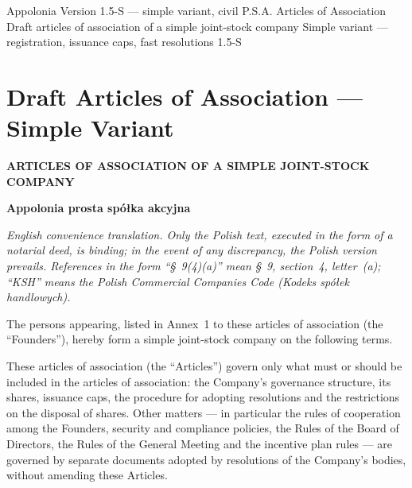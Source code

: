 \documentclass[12pt,a4paper]{report}
\newcommand{\CompanyFull}{Appolonia prosta spółka akcyjna}
\begin{document}
\BusinessPlanTitlePage
  {Appolonia}
  {Version 1.5-S --- simple variant, civil}
  {P.S.A. Articles of Association}
  {Draft articles of association of a simple joint-stock company}
  {Simple variant --- registration, issuance caps, fast resolutions}
  {1.5-S}

\tableofcontents
\newpage

\chapter*{Draft Articles of Association --- Simple Variant}

\begin{center}
{\Large\bfseries ARTICLES OF ASSOCIATION OF A SIMPLE JOINT-STOCK COMPANY}\par
\vspace{0.25cm}
{\LARGE\bfseries \CompanyFull}\par
\vspace{0.6cm}
\end{center}

\begin{center}
\small\itshape English convenience translation. Only the Polish text, executed in the form of a notarial deed, is binding; in the event of any discrepancy, the Polish version prevails. References in the form ``\S~9(4)(a)'' mean \S~9, section~4, letter~(a); ``KSH'' means the Polish Commercial Companies Code (\textit{Kodeks spółek handlowych}).
\end{center}

The persons appearing, listed in Annex~1 to these articles of association (the ``Founders''), hereby form a simple joint-stock company on the following terms.

These articles of association (the ``Articles'') govern only what must or should be included in the articles of association: the Company's governance structure, its shares, issuance caps, the procedure for adopting resolutions and the restrictions on the disposal of shares. Other matters --- in particular the rules of cooperation among the Founders, security and compliance policies, the Rules of the Board of Directors, the Rules of the General Meeting and the incentive plan rules --- are governed by separate documents adopted by resolutions of the Company's bodies, without amending these Articles.
\end{document}
